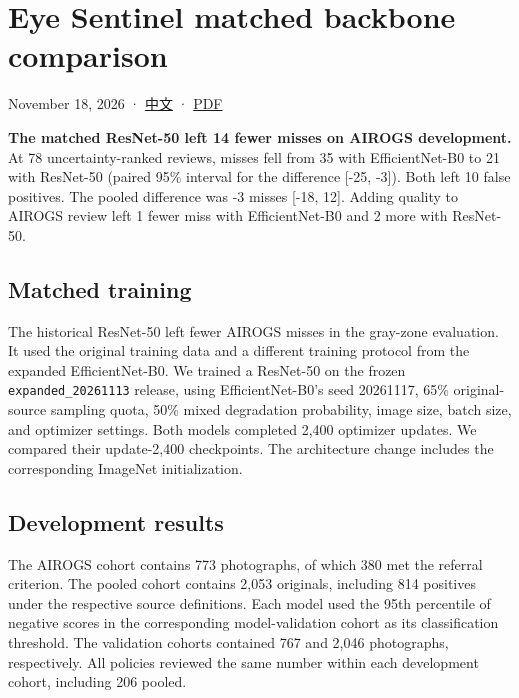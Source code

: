 \documentclass[
  10pt,
]{article}
\author{}
\date{}
\begin{document}
\section{Eye Sentinel matched backbone
comparison}\label{eye-sentinel-matched-backbone-comparison}

November 18, 2026 · \href{backbone-comparison.zh.md}{中文} ·
\href{backbone-comparison.en.pdf}{PDF}

\textbf{The matched ResNet-50 left 14 fewer misses on AIROGS
development.} At 78 uncertainty-ranked reviews, misses fell from 35 with
EfficientNet-B0 to 21 with ResNet-50 (paired 95\% interval for the
difference {[}-25, -3{]}). Both left 10 false positives. The pooled
difference was -3 misses {[}-18, 12{]}. Adding quality to AIROGS review
left 1 fewer miss with EfficientNet-B0 and 2 more with ResNet-50.

\subsection{Matched training}\label{matched-training}

The historical ResNet-50 left fewer AIROGS misses in the gray-zone
evaluation. It used the original training data and a different training
protocol from the expanded EfficientNet-B0. We trained a ResNet-50 on
the frozen \texttt{expanded\_20261113} release, using EfficientNet-B0's
seed 20261117, 65\% original-source sampling quota, 50\% mixed
degradation probability, image size, batch size, and optimizer settings.
Both models completed 2,400 optimizer updates. We compared their
update-2,400 checkpoints. The architecture change includes the
corresponding ImageNet initialization.

\subsection{Development results}\label{development-results}

The AIROGS cohort contains 773 photographs, of which 380 met the
referral criterion. The pooled cohort contains 2,053 originals,
including 814 positives under the respective source definitions. Each
model used the 95th percentile of negative scores in the corresponding
model-validation cohort as its classification threshold. The validation
cohorts contained 767 and 2,046 photographs, respectively. All policies
reviewed the same number within each development cohort, including 206
pooled.
\end{document}
